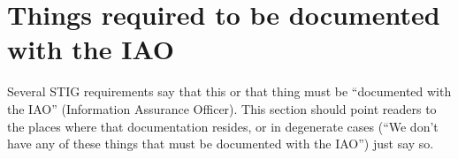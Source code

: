 %

\section{Things required to be documented with the IAO}
\label{DocumentedWithIAO}

Several STIG requirements say that this or that thing must be ``documented
with the IAO'' (Information Assurance Officer). This section should point
readers to the places where that documentation resides, or in degenerate
cases (``We don't have any of these things that must be documented with
the IAO'') just say so.

